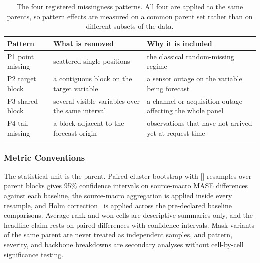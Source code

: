 \documentclass{article}
\newcommand{\ph}[1]{\textcolor{phgray}{\textsf{[\detokenize{#1}]}}}
\begin{document}
\begin{table}[h]
  \caption{The four registered missingness patterns. All four are applied to the same parents,
  so pattern effects are measured on a common parent set rather than on different subsets of
  the data.}
  \label{tab:app-patterns}
  \centering
  \small
  \setlength{\tabcolsep}{4pt}
\begin{tabular}{@{}l p{} p{}@{}}
    \toprule
    Pattern & What is removed & Why it is included \\
    \midrule
    P1 point missing    & scattered single positions & the classical random-missing regime \\
    P2 target block     & a contiguous block on the target variable & a sensor outage on the variable being forecast \\
    P3 shared block     & several visible variables over the same interval & a channel or acquisition outage affecting the whole panel \\
    P4 tail missing     & a block adjacent to the forecast origin & observations that have not arrived yet at request time \\
    \bottomrule
  \end{tabular}
\end{table}

\subsubsection{Metric Conventions}
\label{app:metric-conventions}
The statistical unit is the parent. Paired cluster bootstrap with \ph{N_BOOTSTRAP} resamples
over parent blocks gives 95\% confidence intervals on source-macro MASE differences against
each baseline, the source-macro aggregation is applied inside every resample, and Holm
correction~\citep{holm1979simple} is applied across the pre-declared baseline comparisons.
Average rank and won cells are descriptive summaries only, and the headline claim rests on
paired differences with confidence intervals. Mask variants of the same parent are never
treated as independent samples, and pattern, severity, and backbone breakdowns are secondary
analyses without cell-by-cell significance testing.
\end{document}
